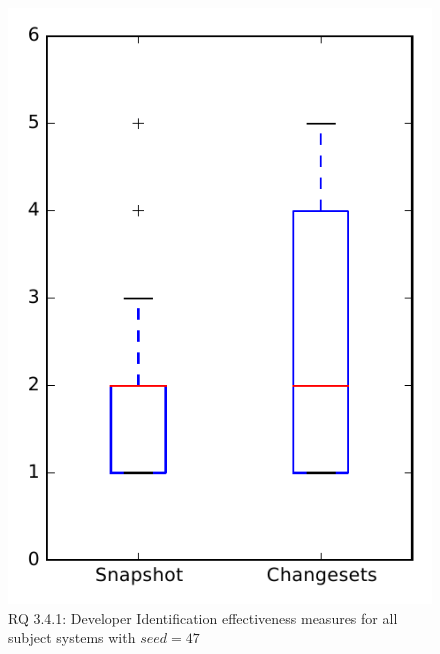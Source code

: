 
\begin{figure}
\centering
\includegraphics[height=0.4\textheight]{figures/dit_seed/rq1_overview_47}
\caption{RQ 3.4.1: Developer Identification effectiveness measures for all subject systems with $seed=47$}
\label{fig:dit_seed:rq1:overview}
\end{figure}
